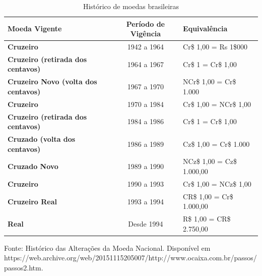 \documentclass[12pt,oneside,a4paper,chapter=TITLE,english,brazil,sumario=abnt-6027-2012]{abntex2}
\begin{document}
\begin{table}[H]
	\caption{Histórico de moedas brasileiras}
	\centering
	\begin{tabular}{ | l || c | l | }
		\hline
		\textbf{Moeda Vigente}                      & \textbf{Período de Vigência} & \textbf{Equivalência}      \\
		\hline
		\textbf{Cruzeiro}                           & 1942 a 1964                  & Cr\$ 1,00 = Rs 1\$000      \\
		\textbf{Cruzeiro (retirada dos centavos)}   & 1964 a 1967                  & Cr\$ 1 = Cr\$ 1,00         \\
		\textbf{Cruzeiro Novo (volta dos centavos)} & 1967 a 1970                  & NCr\$ 1,00 = Cr\$ 1.000    \\
		\textbf{Cruzeiro}                           & 1970 a 1984                  & Cr\$ 1,00 = NCr\$ 1,00     \\
		\textbf{Cruzeiro (retirada dos centavos)}   & 1984 a 1986                  & Cr\$ 1 = Cr\$ 1,00         \\
		\textbf{Cruzado (volta dos centavos)}       & 1986 a 1989                  & Cz\$ 1,00 = Cr\$ 1.000     \\
		\textbf{Cruzado Novo}                       & 1989 a 1990                  & NCz\$ 1,00 = Cz\$ 1.000,00 \\
		\textbf{Cruzeiro}                           & 1990 a 1993                  & Cr\$ 1,00 = NCz\$ 1,00     \\
		\textbf{Cruzeiro Real}                      & 1993 a 1994                  & CR\$ 1,00 = Cr\$ 1.000,00  \\
		\textbf{Real}                               & Desde 1994                   & R\$ 1,00 = CR\$ 2.750,00   \\                                                                  
		\hline
	\end{tabular}
	
	\label{table:currencyhist}
	\vspace{1ex}
	
	\raggedright{
		\noindent \footnotesize{Fonte: Histórico das Alterações da Moeda Nacional. Disponível em \\ https://web.archive.org/web/20151115205007/http://www.ocaixa.com.br/passos/passos2.htm.}}
\end{table}
\vspace{-0.2cm}
\vspace{0.5cm}
\end{document}
